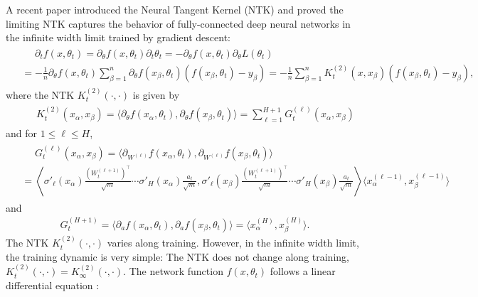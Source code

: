 \documentclass{article}
\numberwithin{equation}{section}
\newcommand{\al}{\alpha}
\renewcommand{\leq}{\leqslant}
\newcommand{\del}{\partial}
\newcommand{\1}{\mathds{1}}
\theoremstyle{plain} %
\begin{document}
A recent paper \cite{jacot2018neural} introduced
the Neural Tangent Kernel (NTK) and proved the limiting NTK captures the behavior of fully-connected deep neural networks in the infinite width limit trained by gradient descent: 
\begin{align}\begin{split}\label{e:descent}
&\phantom{{}={}}\del_t f(x,\theta_t)
=\del_\theta f(x,\theta_t) \del_t \theta_t
=-\del_\theta f(x,\theta_t) \del_\theta L(\theta_t)\\
&=-\frac{1}{n}\del_\theta f(x,\theta_t) \sum_{ \beta =1}^n \del_\theta f(x_\beta, \theta_t) (f(x_\beta, \theta_t)-y_\beta)
=-\frac{1}{n}\sum_{\beta=1}^n K^{(2)}_t(x,x_\beta) (f(x_\beta, \theta_t)-y_\beta),
\end{split}\end{align}
where the NTK $K_t^{(2)}(\cdot, \cdot)$ is given by 
\begin{align}\begin{split}\label{e:defK2}
 &\phantom{{}={}}K^{(2)}_t(x_\al,x_\beta)  
 =\langle \del_\theta f(x_\al,\theta_t) , \del_\theta f(x_\beta, \theta_t)\rangle=\sum_{\ell=1}^{H+1}G_t^{(\ell)}(x_\al, x_\beta)
\end{split}\end{align}
and for $1\leq \ell\leq H$,
\begin{align*}\begin{split}
&\phantom{{}={}}G_t^{(\ell)}(x_\al, x_\beta)= \langle \del_{W^{(\ell)} } f(x_\al,\theta_t) ,  \del_{W^{(\ell)} }  f(x_\beta, \theta_t)\rangle\\
&= \left\langle
\sigma'_\ell(x_\al)\frac{(W_t^{(\ell+1)})^\top}{\sqrt m}\cdots \sigma'_{H}(x_\al)\frac{a_t}{\sqrt m}, \sigma'_\ell(x_\beta)\frac{(W_t^{(\ell+1)})^\top}{\sqrt m}\cdots \sigma'_{H}(x_\beta)\frac{a_t}{\sqrt m}  \right\rangle \langle x^{(\ell-1)}_\al, x^{(\ell-1)}_\beta \rangle
\end{split}\end{align*}
and 
\begin{align*}
G_t^{(H+1)}=\langle \del_a f(x_\al, \theta_t), \del_a f(x_\beta,\theta_t)\rangle=\langle x_\al^{(H)}, x_\beta^{(H)}\rangle.
\end{align*}
The NTK $K_t^{(2)}(\cdot, \cdot)$ varies along training. However, in the infinite width limit, the training dynamic is very simple: The NTK does not change along training, $K_t^{(2)}(\cdot, \cdot)=K_\infty^{(2)}(\cdot, \cdot)$. The network function $f(x,\theta_t)$ follows a linear differential equation \cite{jacot2018neural}:
\end{document}
